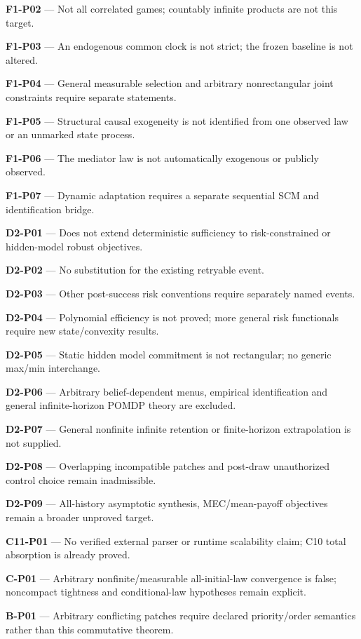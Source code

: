 \documentclass[
  11pt,
  a4paper,
]{article}
\begin{document}
\textbf{F1-P02} --- Not all correlated games; countably infinite
products are not this target.

\textbf{F1-P03} --- An endogenous common clock is not strict; the frozen
baseline is not altered.

\textbf{F1-P04} --- General measurable selection and arbitrary
nonrectangular joint constraints require separate statements.

\textbf{F1-P05} --- Structural causal exogeneity is not identified from
one observed law or an unmarked state process.

\textbf{F1-P06} --- The mediator law is not automatically exogenous or
publicly observed.

\textbf{F1-P07} --- Dynamic adaptation requires a separate sequential
SCM and identification bridge.

\textbf{D2-P01} --- Does not extend deterministic sufficiency to
risk-constrained or hidden-model robust objectives.

\textbf{D2-P02} --- No substitution for the existing retryable event.

\textbf{D2-P03} --- Other post-success risk conventions require
separately named events.

\textbf{D2-P04} --- Polynomial efficiency is not proved; more general
risk functionals require new state/convexity results.

\textbf{D2-P05} --- Static hidden model commitment is not rectangular;
no generic max/min interchange.

\textbf{D2-P06} --- Arbitrary belief-dependent menus, empirical
identification and general infinite-horizon POMDP theory are excluded.

\textbf{D2-P07} --- General nonfinite infinite retention or
finite-horizon extrapolation is not supplied.

\textbf{D2-P08} --- Overlapping incompatible patches and post-draw
unauthorized control choice remain inadmissible.

\textbf{D2-P09} --- All-history asymptotic synthesis, MEC/mean-payoff
objectives remain a broader unproved target.

\textbf{C11-P01} --- No verified external parser or runtime scalability
claim; C10 total absorption is already proved.

\textbf{C-P01} --- Arbitrary nonfinite/measurable all-initial-law
convergence is false; noncompact tightness and conditional-law
hypotheses remain explicit.

\textbf{B-P01} --- Arbitrary conflicting patches require declared
priority/order semantics rather than this commutative theorem.
\end{document}
